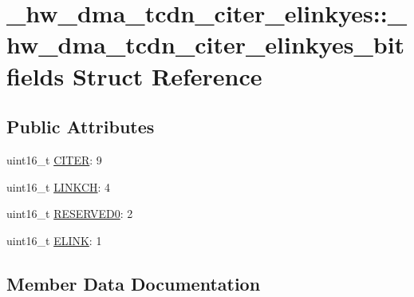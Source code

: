 \hypertarget{struct__hw__dma__tcdn__citer__elinkyes_1_1__hw__dma__tcdn__citer__elinkyes__bitfields}{}\section{\+\_\+hw\+\_\+dma\+\_\+tcdn\+\_\+citer\+\_\+elinkyes\+:\+:\+\_\+hw\+\_\+dma\+\_\+tcdn\+\_\+citer\+\_\+elinkyes\+\_\+bitfields Struct Reference}
\label{struct__hw__dma__tcdn__citer__elinkyes_1_1__hw__dma__tcdn__citer__elinkyes__bitfields}
\subsection*{Public Attributes}
\begin{DoxyCompactItemize}
\item 
uint16\+\_\+t \hyperlink{struct__hw__dma__tcdn__citer__elinkyes_1_1__hw__dma__tcdn__citer__elinkyes__bitfields_a33af5a117add62bc72b0ce77ccda0333}{C\+I\+T\+ER}\+: 9
\item 
uint16\+\_\+t \hyperlink{struct__hw__dma__tcdn__citer__elinkyes_1_1__hw__dma__tcdn__citer__elinkyes__bitfields_a8949560030d9f7a47495a51b4828aa81}{L\+I\+N\+K\+CH}\+: 4
\item 
uint16\+\_\+t \hyperlink{struct__hw__dma__tcdn__citer__elinkyes_1_1__hw__dma__tcdn__citer__elinkyes__bitfields_a1f323ac0d5ea5bc3415c38169a242d9a}{R\+E\+S\+E\+R\+V\+E\+D0}\+: 2
\item 
uint16\+\_\+t \hyperlink{struct__hw__dma__tcdn__citer__elinkyes_1_1__hw__dma__tcdn__citer__elinkyes__bitfields_a495e0f43957fe2bf3d12838d15931f6e}{E\+L\+I\+NK}\+: 1
\end{DoxyCompactItemize}


\subsection{Member Data Documentation}
